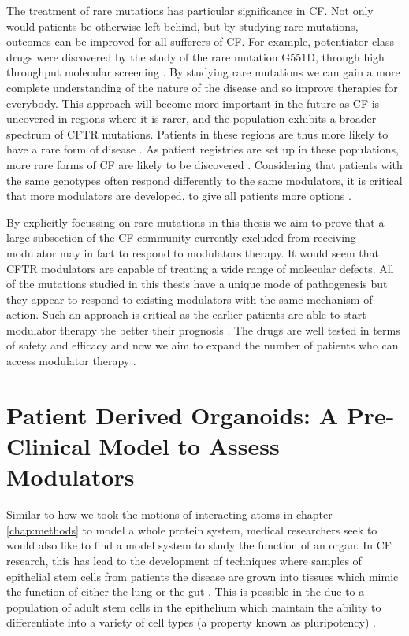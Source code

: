 The treatment of rare mutations has particular significance in CF. Not only would patients be otherwise left behind, but by studying rare mutations, outcomes can be improved for all sufferers of CF. For example, potentiator class drugs were discovered by the study of the rare mutation G551D, through high throughput molecular screening \cite{vangoor2009}. By studying rare mutations we can gain a more complete understanding of the nature of the disease and so improve therapies for everybody. This approach will become more important in the future as CF is uncovered in regions where it is rarer, and the population exhibits a broader spectrum of CFTR mutations. Patients in these regions are thus more likely to have a rare form of disease \cite{singh2015,zheng2017,ni2022}. As patient registries are set up in these populations, more rare forms of CF are likely to be discovered \cite{zheng2017}. Considering that patients with the same genotypes often respond differently to the same modulators, it is critical that more modulators are developed, to give all patients more options \cite{hanafin2021}.


By explicitly focussing on rare mutations in this thesis we aim to prove that a large subsection of the CF community currently excluded from receiving modulator may in fact to respond to modulators therapy. It would seem that CFTR modulators are capable of treating a wide range of molecular defects. All of the mutations studied in this thesis have a unique mode of pathogenesis but they appear to respond to existing modulators with the same mechanism of action. Such an approach is critical as the earlier patients are able to start modulator therapy the better their prognosis \cite{lahiri2022}. The drugs are well tested in terms of safety and efficacy and now we aim to expand the number of patients who can access modulator therapy \cite{lahiri2022}.

\section{Patient Derived Organoids: A Pre-Clinical Model to Assess Modulators}
Similar to how we took the motions of interacting atoms in chapter \ref{chap:methods} to model a whole protein system, medical researchers seek to would also like to find a model system to study the function of an organ. In CF research, this has lead to the development of techniques where samples of epithelial stem cells from patients the disease are grown into tissues which mimic the function of either the lung or the gut \cite{wong2015,depoel2020}. This is possible in the due to a population of adult stem cells in the epithelium which maintain the ability to differentiate into a variety of cell types (a property known as pluripotency) \cite{blanpain2007}. 

